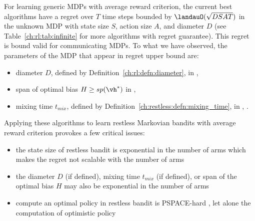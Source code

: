 For learning generic MDPs with average reward criterion, the current best algorithms have a regret over $T$ time steps bounded by $\landauO(\sqrt{DSAT})$ in the unknown MDP with state size $S$, action size $A$, and diameter $D$ (see Table~\ref{ch:rl:tab:infinite} for more algorithms with regret guarantee).
This regret is bound valid for communicating MDPs.
To what we have observed, the parameters of the MDP that appear in regret upper bound are:
\begin{itemize}
    \item diameter $D$, defined by Definition~\ref{ch:rl:defn:diameter}, in \eg, \cite{jaksch2010near, fruit2020improved, tossou2019near}
    \item span of optimal bias $H\ge sp(\vh^*)$ in \eg, \cite{bartlett2012regal, ouyang2017learning, fruit2018efficient, zhang2019regret}
    \item mixing time $t_{mix}$, defined by Definition~\ref{ch:restless:defn:mixing_time}, in \eg, \cite{ortner2020regret}.
\end{itemize}
Applying these algorithms to learn restless Markovian bandits with average reward criterion provokes a few critical issues:
\begin{itemize}
    \item the state size of restless bandit is exponential in the number of arms which makes the regret not scalable with the number of arms
    \item the diameter $D$ (if defined), mixing time $t_{mix}$ (if defined), or span of the optimal bias $H$ may also be exponential in the number of arms
    \item compute an optimal policy in restless bandit is PSPACE-hard \cite{papadimitriou1994complexity}, let alone the computation of optimistic policy
\end{itemize}

